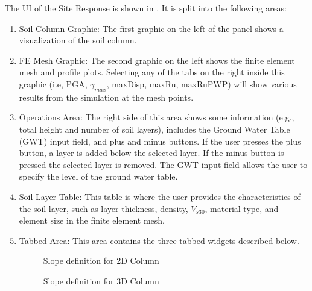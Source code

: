 The UI of the Site Response is shown in . It is split into the following areas:
\begin{enumerate}
\item Soil Column Graphic: The first graphic on the left of the panel shows a visualization of the soil column.
\item FE Mesh Graphic: The second graphic on the left shows 
the finite element mesh and profile plots. Selecting any of the tabs on the right inside this graphic (i.e, PGA, $\gamma_{max}$, maxDisp, maxRu, maxRuPWP) will show various results
from the simulation at the mesh points.
\item Operations Area: The right side of this area shows some information (e.g., total height and number of soil layers), includes the Ground Water Table (GWT) input field, and plus and minus buttons. 
If the user presses the plus button, a layer is added below the selected layer. If the minus button is pressed the selected layer is removed. The GWT input field allows the user to specify the level of the ground water table.
\item Soil Layer Table: This table is where the user provides the characteristics of the soil layer, such as layer thickness, density, $V_{s30}$, material type, and element size in the finite element mesh.
\item Tabbed Area: This area contains the three tabbed widgets described below.

\begin{figure}[!htbp]
  \caption{Slope definition for 2D Column }
  \label{fig:slope2D}
\end{figure}


\begin{figure}[!htbp]
  \caption{Slope definition for 3D Column}
  \label{fig:slope3D}
\end{figure}



\end{enumerate}
